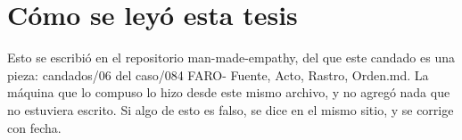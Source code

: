 \documentclass[11pt,a4paper]{article}
\begin{document}
\section*{Cómo se leyó esta tesis}
Esto se escribió en el repositorio man-made-empathy, del que este candado es una pieza: candados/06 del caso/084 FARO- Fuente, Acto, Rastro, Orden.md. La máquina que lo compuso lo hizo desde este mismo archivo, y no agregó nada que no estuviera escrito. Si algo de esto es falso, se dice en el mismo sitio, y se corrige con fecha.
\end{document}
